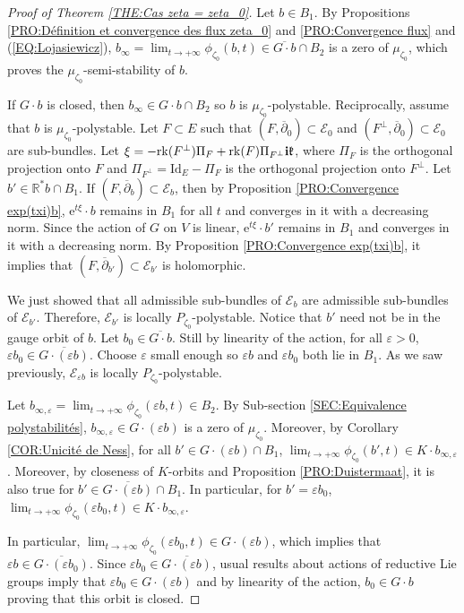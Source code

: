 \documentclass{article}
\theoremstyle{remark}
\theoremstyle{definition}
\newcommand{\R}{\mathbb{R}}
\newcommand{\rk}{\mathrm{rk}}
\newcommand{\Id}{\mathrm{Id}}
\renewcommand{\i}{\boldsymbol{\mathrm{i}}}
\newcommand{\e}{\boldsymbol{\mathrm{e}}}
\newcommand{\E}{\mathcal{E}}
\newcommand{\dbar}{\overline{\partial}}
\begin{document}
\begin{proof}[Proof of Theorem \ref{THE:Cas zeta = zeta_0}]
Let $b \in B_1$. By Propositions \ref{PRO:Définition et convergence des flux zeta_0} and \ref{PRO:Convergence flux} and (\ref{EQ:Lojasiewicz}), $b_\infty = \lim_{t \rightarrow +\infty} \phi_{\zeta_0}(b,t) \in \overline{G \cdot b} \cap B_2$ is a zero of $\mu_{\zeta_0}$, which proves the $\mu_{\zeta_0}$-semi-stability of $b$.

If $G \cdot b$ is closed, then $b_\infty \in G \cdot b \cap B_2$ so $b$ is $\mu_{\zeta_0}$-polystable. Reciprocally, assume that $b$ is $\mu_{\zeta_0}$-polystable. Let $F \subset E$ such that $(F,\dbar_0) \subset \E_0$ and $(F^\bot,\dbar_0) \subset \E_0$ are sub-bundles. Let $\xi = -\rk(F^\bot)\Pi_F + \rk(F)\Pi_{F^\bot} \i\frak{k}$, where $\Pi_F$ is the orthogonal projection onto $F$ and $\Pi_{F^\bot} = \Id_E - \Pi_F$ is the orthogonal projection onto $F^\bot$. Let $b' \in \R^*b \cap B_1$. If $(F,\dbar_b) \subset \E_b$, then by Proposition \ref{PRO:Convergence exp(txi)b}, $\e^{t\xi} \cdot b$ remains in $B_1$ for all $t$ and converges in it with a decreasing norm. Since the action of $G$ on $V$ is linear, $\e^{t\xi} \cdot b'$ remains in $B_1$ and converges in it with a decreasing norm. By Proposition \ref{PRO:Convergence exp(txi)b}, it implies that $(F,\dbar_{b'}) \subset \E_{b'}$ is holomorphic.

We just showed that all admissible sub-bundles of $\E_b$ are admissible sub-bundles of $\E_{b'}$. Therefore, $\E_{b'}$ is locally $P_{\zeta_0}$-polystable. Notice that $b'$ need not be in the gauge orbit of $b$. Let $b_0 \in \overline{G \cdot b}$. Still by linearity of the action, for all $\varepsilon > 0$, $\varepsilon b_0 \in \overline{G \cdot (\varepsilon b)}$. Choose $\varepsilon$ small enough so $\varepsilon b$ and $\varepsilon b_0$ both lie in $B_1$. As we saw previously, $\E_{\varepsilon b}$ is locally $P_{\zeta_0}$-polystable.

Let $b_{\infty,\varepsilon} = \lim_{t \rightarrow +\infty} \phi_{\zeta_0}(\varepsilon b,t) \in B_2$. By Sub-section \ref{SEC:Equivalence polystabilités}, $b_{\infty,\varepsilon} \in G \cdot (\varepsilon b)$ is a zero of $\mu_{\zeta_0}$. Moreover, by Corollary \ref{COR:Unicité de Ness}, for all $b' \in G \cdot (\varepsilon b) \cap B_1$, $\lim_{t \rightarrow +\infty} \phi_{\zeta_0}(b',t) \in K \cdot b_{\infty,\varepsilon}$. Moreover, by closeness of $K$-orbits and Proposition \ref{PRO:Duistermaat}, it is also true for $b' \in \overline{G \cdot (\varepsilon b)} \cap B_1$. In particular, for $b' = \varepsilon b_0$, $\lim_{t \rightarrow +\infty} \phi_{\zeta_0}(\varepsilon b_0,t) \in K \cdot b_{\infty,\varepsilon}$.

In particular, $\lim_{t \rightarrow +\infty} \phi_{\zeta_0}(\varepsilon b_0,t) \in G \cdot (\varepsilon b)$, which implies that $\varepsilon b \in \overline{G \cdot (\varepsilon b_0)}$. Since $\varepsilon b_0 \in \overline{G \cdot (\varepsilon b)}$, usual results about actions of reductive Lie groups imply that $\varepsilon b_0 \in G \cdot (\varepsilon b)$ and by linearity of the action, $b_0 \in G \cdot b$ proving that this orbit is closed.
\end{proof}
\end{document}
